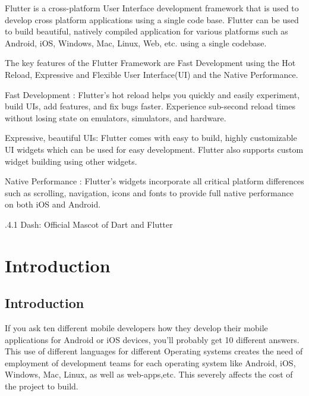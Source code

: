 \documentclass[11pt,a4paper,oneside,openright]{report}
\begin{document}
{{ \hspace{0.2in}Flutter is a cross-platform User Interface development framework that is used to develop cross platform applications using a single code base. Flutter can be used to build beautiful, natively compiled application for various platforms such as Android, iOS, Windows, Mac, Linux, Web, etc. using a single codebase. 

 \hspace{0.2in}The key features of the Flutter Framework are Fast Development using the Hot Reload, Expressive and Flexible User Interface(UI) and the Native Performance.

\hspace{0.2in}Fast Development : Flutter's hot reload helps you quickly and easily experiment, build UIs, add features, and fix bugs faster. Experience sub-second reload times without losing state on emulators, simulators, and hardware.

\hspace{0.2in} Expressive, beautiful UIs: Flutter comes with easy to build, highly customizable UI widgets which can be used for easy development. Flutter also supports custom widget building using other widgets.

\hspace{0.2in} Native Performance : Flutter’s widgets incorporate all critical platform differences such as scrolling, navigation, icons and fonts to provide full native performance on both iOS and Android. 

\newpage
{} %
\tableofcontents
\newpage

.4.1 Dash: Official Mascot of Dart and Flutter
 




\chapter{Introduction}
\label{chap:intro}

\section{Introduction}
\hspace{0.2in} If you ask ten different mobile developers how they develop their mobile applications for Android or iOS devices, you'll probably get 10 different answers. This use of different languages for different Operating systems creates the need of employment of development teams for each operating system like Android, iOS, Windows, Mac, Linux, as well as web-apps,etc. This severely affects the cost of the project to build. 
				
}}
\end{document}
